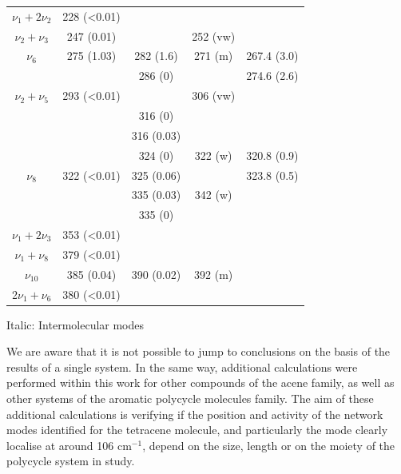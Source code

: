 \begin{table}[H]
\begin{center}
\begin{threeparttable}
\begin{tabular}{c c c c c}
 		  $\nu_{1}+ 2\nu_{2}$ & 228 (<0.01) & & & \\
 		  $\nu_{2}+\nu_{3}$& 247 (0.01) &  & 252 (vw) & \\
 		  $\nu_{6}$ & 275 (1.03) & 282 (1.6) & 271 (m) & 267.4 (3.0)\\
 		  	&  & 286 (0) &  & 274.6 (2.6)\\
 		  	$\nu_{2}+ \nu_{5}$ & 293 (<0.01) &  & 306 (vw) & \\
 		  	& & 316 (0) & & \\
 		   & & 316 (0.03) & & \\
 		    &  & 324 (0) & 322 (w) & 320.8 (0.9)\\
 		    $\nu_{8}$& 322 (<0.01) & 325 (0.06) & & 323.8 (0.5)\\
 		    &  & 335 (0.03) & 342 (w) & \\
 		    & & 335 (0) & & \\
 		    $\nu_{1}+ 2\nu_{3}$ & 353 (<0.01) & &  & \\	
 		    $\nu_{1}+ \nu_{8}$ & 379 (<0.01) & & & \\
 		    $\nu_{10}$ & 385 (0.04) & 390 (0.02) &  392 (m) & \\
 		    2$\nu_{1}+ \nu_{6}$ & 380 (<0.01) &  & & \\
 		    \bottomrule	    
 		  \end{tabular}
 		  
 		  \begin{tablenotes}
 		  	\item[] Italic: Intermolecular modes
 		  \end{tablenotes}
 		\end{threeparttable}
 	\end{center}
 \end{table}
 
 
 
 We are aware that it is not possible to jump to conclusions on the basis of the results of a single system. In the same way, additional calculations were performed within this work for other compounds of the acene family, as well as other systems of the aromatic polycycle molecules family. The aim of these additional calculations is verifying if the position and activity of the network modes identified for the tetracene molecule, and particularly the mode clearly localise at around 106 cm$^{-1}$, depend on the size, length or on the moiety of the polycycle system in study.\\
 
